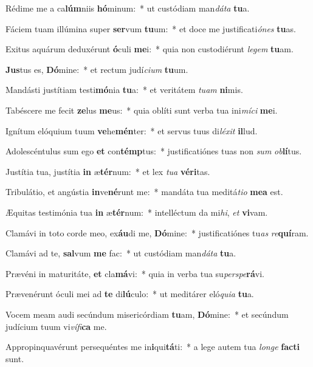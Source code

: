 \item Rédime me a ca\textbf{lúm}niis \textbf{hó}minum:~* ut custódiam man\textit{dá}\textit{ta} \textbf{tu}a.
\item Fáciem tuam illúmina super \textbf{ser}vum \textbf{tu}um:~* et doce me justificati\textit{ó}\textit{nes} \textbf{tu}as.
\item Exitus aquárum deduxérunt \textbf{ó}culi \textbf{me}i:~* quia non custodiérunt \textit{le}\textit{gem} \textbf{tu}am.
\item \textbf{Jus}tus es, \textbf{Dó}mine:~* et rectum judí\textit{ci}\textit{um} \textbf{tu}um.
\item Mandásti justítiam testi\textbf{mó}nia \textbf{tu}a:~* et veritátem \textit{tu}\textit{am} \textbf{ni}mis.
\item Tabéscere me fecit \textbf{ze}lus \textbf{me}us:~* quia oblíti sunt verba tua ini\textit{mí}\textit{ci} \textbf{me}i.
\item Ignítum elóquium tuum \textbf{ve}he\textbf{mén}ter:~* et servus tuus di\textit{lé}\textit{xit} \textbf{il}lud.
\item Adolescéntulus sum ego \textbf{et} con\textbf{témp}tus:~* justificatiónes tuas non \textit{sum} \textit{ob}\textbf{lí}tus.
\item Justítia tua, justítia \textbf{in} æ\textbf{tér}num:~* et lex \textit{tu}\textit{a} \textbf{vé}\textbf{ri}tas.
\item Tribulátio, et angústia \textbf{in}ve\textbf{né}runt me:~* mandáta tua meditá\textit{ti}\textit{o} \textbf{me}\textbf{a} est.
\item Æquitas testimónia tua \textbf{in} æ\textbf{tér}num:~* intelléctum da mi\textit{hi}, \textit{et} \textbf{vi}vam.
\item Clamávi in toto corde meo, ex\textbf{áu}di me, \textbf{Dó}mine:~* justificatiónes tu\textit{as} \textit{re}\textbf{quí}ram.
\item Clamávi ad te, \textbf{sal}vum \textbf{me} fac:~* ut custódiam man\textit{dá}\textit{ta} \textbf{tu}a.
\item Prævéni in maturitáte, \textbf{et} cla\textbf{má}vi:~* quia in verba tua su\textit{per}\textit{spe}\textbf{rá}vi.
\item Prævenérunt óculi mei ad \textbf{te} di\textbf{lú}culo:~* ut meditárer eló\textit{qui}\textit{a} \textbf{tu}a.
\item Vocem meam audi secúndum misericórdiam \textbf{tu}am, \textbf{Dó}mine:~* et secúndum judícium tuum vi\textit{ví}\textit{fi}\textbf{ca} me.
\item Appropinquavérunt persequéntes me in\textbf{i}qui\textbf{tá}ti:~* a lege autem tua \textit{lon}\textit{ge} \textbf{fac}\textbf{ti} sunt.

